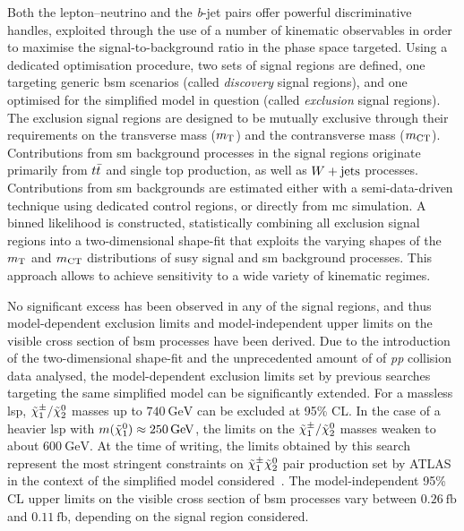 Both the lepton--neutrino and the \textit{b}-jet pairs offer powerful discriminative handles, exploited through the use of a number of kinematic observables in order to maximise the signal-to-background ratio in the phase space targeted.
Using a dedicated optimisation procedure, two sets of signal regions are defined, one targeting generic \gls{bsm} scenarios (called \textit{discovery} signal regions), and one optimised for the simplified model in question (called \textit{exclusion} signal regions). 
The exclusion signal regions are designed to be mutually exclusive through their requirements on the transverse mass ($m_{\textrm{T}}$) and the contransverse mass ($m_{\textrm{CT}}$).
Contributions from \gls{sm} background processes in the signal regions originate primarily from $t\bar{t}$ and single top production, as well as $W+\mathrm{jets}$ processes. Contributions from \gls{sm} backgrounds are estimated either with a semi-data-driven technique using dedicated control regions, or directly from \gls{mc} simulation.
A binned likelihood is constructed, statistically combining all exclusion signal regions into a two-dimensional shape-fit that exploits the varying shapes of the $m_{\textrm{T}}$ and $m_{\textrm{CT}}$ distributions of \gls{susy} signal and \gls{sm} background processes. This approach allows to achieve sensitivity to a wide variety of kinematic regimes.

No significant excess has been observed in any of the signal regions, and thus model-dependent exclusion limits and model-independent upper limits on the visible cross section of \gls{bsm} processes have been derived.
Due to the introduction of the two-dimensional shape-fit and the unprecedented amount of \onethirtynineifb of \textit{pp} collision data analysed, the model-dependent exclusion limits set by previous searches targeting the same simplified model can be significantly extended.
For a massless \gls{lsp}, $\tilde{\chi}_1^\pm/\tilde{\chi}_2^0$ masses up to $\SI{740}{\GeV}$ can be excluded at 95\% CL. In the case of a heavier \gls{lsp} with $m(\lsp)\approx\SI{250}{\GeV}$, the limits on the $\tilde{\chi}_1^\pm/\tilde{\chi}_2^0$ masses weaken to about $\SI{600}{\GeV}$.
At the time of writing, the limits obtained by this search represent the most stringent constraints on $\tilde{\chi}_1^\pm\tilde{\chi}_2^0$ pair production set by ATLAS in the context of the simplified model considered~\cite{ATL-PHYS-PUB-2020-020}.
The model-independent 95\% CL upper limits on the visible cross section of \gls{bsm} processes vary between $\SI{0.26}{\femto\barn}$ and $\SI{0.11}{\femto\barn}$, depending on the signal region considered. 

